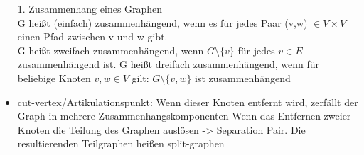\documentclass[a4paper]{article}
\begin{document}
\begin{itemize}
\item[1. ]Zusammenhang eines Graphen\\
G heißt (einfach) zusammenhängend, wenn es für jedes Paar (v,w) $\in V\times V$ einen Pfad zwischen v und w gibt.\\
G heißt zweifach zusammenhängend, wenn $G\setminus \{v\}$ für jedes $v\in E$ zusammenhängend ist.
G heißt dreifach zusammenhängend, wenn für beliebige Knoten $v,w\in V$ gilt: $G\setminus \{v,w\}$ ist zusammenhängend
\item cut-vertex/Artikulationspunkt: Wenn dieser Knoten entfernt wird, zerfällt der Graph in mehrere Zusammenhangskomponenten
Wenn das Entfernen zweier Knoten die Teilung des Graphen auslösen -> Separation Pair. Die resultierenden Teilgraphen heißen split-graphen
\end{itemize}
\end{document}
